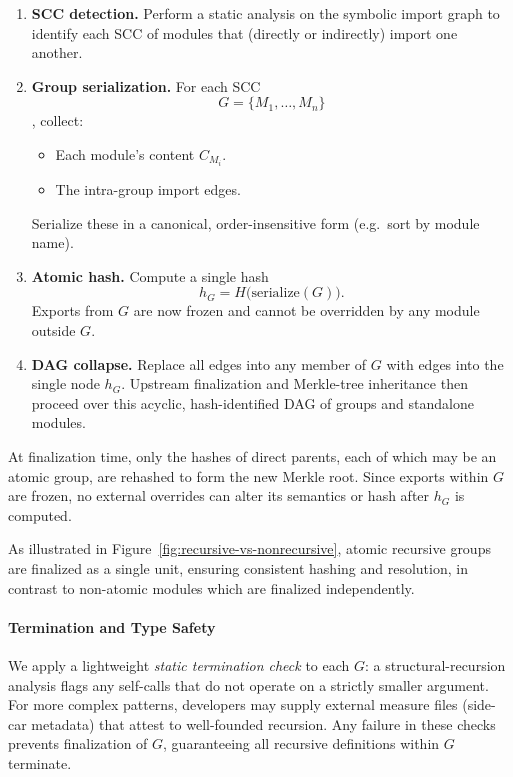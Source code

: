 \documentclass[sigplan,screen]{acmart}
\begin{document}
\begin{enumerate}
	\item \textbf{SCC detection.} Perform a static analysis on the symbolic import graph to identify each SCC of modules that (directly or indirectly) import one another.
	\item \textbf{Group serialization.} For each SCC \[G = \{M_1,\dots,M_n\}\], collect:
	\begin{itemize}
		\item Each module's content $C_{M_i}$.
		\item The intra-group import edges.
	\end{itemize}
	Serialize these in a canonical, order-insensitive form (e.g.\ sort by module name).
	\item \textbf{Atomic hash.} Compute a single hash
		\[
			h_G = H\bigl(\mathrm{serialize}(G)\bigr).
		\]
	Exports from $G$ are now frozen and cannot be overridden by any module outside $G$.
	\item \textbf{DAG collapse.} Replace all edges into any member of $G$ with edges into the single node $h_G$. Upstream finalization and Merkle-tree inheritance then proceed over this acyclic, hash-identified DAG of groups and standalone modules.
\end{enumerate}

At finalization time, only the hashes of direct parents, each of which may be an atomic group, are rehashed to form the new Merkle root. Since exports within $G$ are frozen, no external overrides can alter its semantics or hash after $h_G$ is computed.

As illustrated in Figure~\ref{fig:recursive-vs-nonrecursive}, atomic recursive groups are finalized as a single unit, ensuring consistent hashing and resolution, in contrast to non-atomic modules which are finalized independently.

\paragraph{Termination and Type Safety} 
We apply a lightweight \emph{static termination check} to each $G$: a structural-recursion analysis flags any self-calls that do not operate on a strictly smaller argument. For more complex patterns, developers may supply external measure files (side-car metadata) that attest to well-founded recursion. Any failure in these checks prevents finalization of $G$, guaranteeing all recursive definitions within $G$ terminate.
\end{document}
